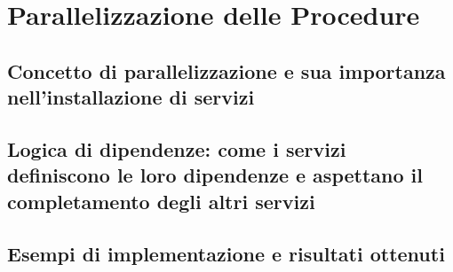 \chapter{Parallelizzazione delle Procedure}
\label{cha:parallelizzazione}

\section{Concetto di parallelizzazione e sua importanza nell'installazione di
servizi}
\label{sec:introduzione_parallelizzazione}

\lipsum[1]

\section{Logica di dipendenze: come i servizi definiscono le loro dipendenze e aspettano
il completamento degli altri servizi}
\label{sec:dipendenze}

\lipsum[1]

\section{Esempi di implementazione e risultati ottenuti}
\label{sec:esempi_risultati}

\lipsum[1]